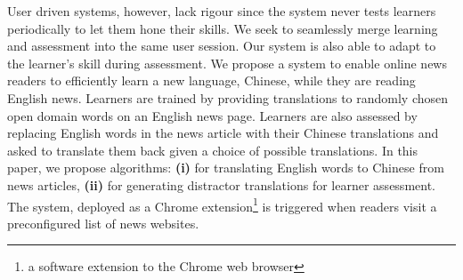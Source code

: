 User driven systems, however, lack rigour since the system never tests learners 
periodically to let them hone their skills. We seek to seamlessly merge learning 
and assessment into the same user session. 
Our system is also able to adapt to the learner's skill during assessment.
We propose a system to enable online news readers to efficiently learn 
a new language, Chinese, while they are reading English news. Learners are 
trained by providing translations to randomly chosen open domain words on an 
English news page. Learners are also assessed by replacing English words in the 
news article with their Chinese  translations and  asked to translate them back 
given a choice of possible translations. In this paper, we propose algorithms: 
\textbf{(i)} for translating English words to Chinese from news articles, 
\textbf{(ii)} for generating distractor translations for learner assessment.
The system, deployed as a Chrome extension\footnote{a software extension to the 
	Chrome web browser} is triggered when readers visit a preconfigured list 
of news websites.

